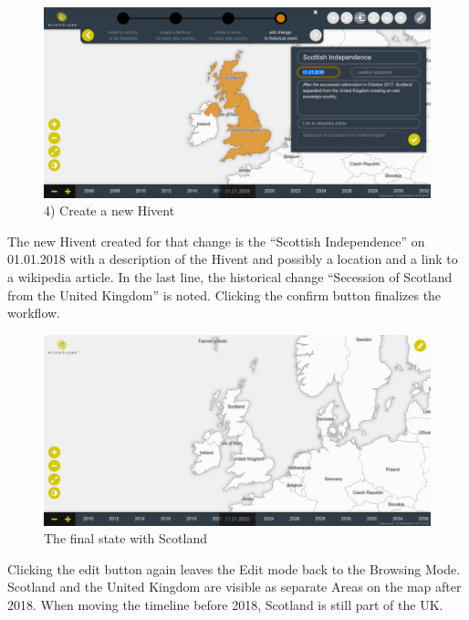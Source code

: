 \vspace{1em}
\begin{minipage}[t]{0.47\textwidth}

  \begin{figure}[H]
    \centering
    \includegraphics[width=1.0\textwidth]{graphics/development/final_interface/7_add_change_to_hivent_2.png}
    \caption{4) Create a new Hivent}
    \label{fig:final_7_add_change_to_hivent_2}
  \end{figure}

  The new Hivent created for that change is the ``Scottish Independence'' on 01.01.2018 with a description of the Hivent and possibly a location and a link to a wikipedia article. In the last line, the historical change ``Secession of Scotland from the United Kingdom'' is noted. Clicking the confirm button finalizes the workflow.

\end{minipage}    %
\hspace{1.5em}    %
\begin{minipage}[t]{0.47\textwidth}

  \begin{figure}[H]
    \centering
    \includegraphics[width=1.0\textwidth]{graphics/development/final_interface/8_final_state.png}
    \caption{The final state with Scotland}
    \label{fig:final_8_final_state}
  \end{figure}

  Clicking the edit button again leaves the Edit mode back to the Browsing Mode. Scotland and the United Kingdom are visible as separate Areas on the map after 2018. When moving the timeline before 2018, Scotland is still part of the UK.

\end{minipage}


